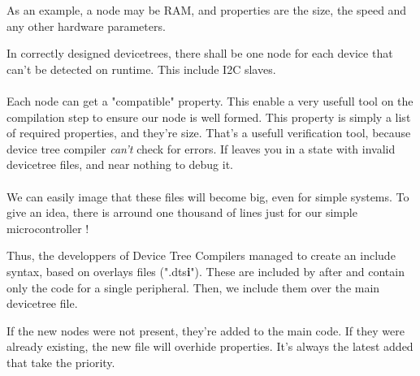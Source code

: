 As an example, a node may be RAM, and properties are the size, the speed and
any other hardware parameters.

In correctly designed devicetrees, there shall be one node for each device that
can't be detected on runtime. This include I2C slaves.

\paragraph{}
Each node can get a "compatible" property. This enable a very usefull tool on
the compilation step to ensure our node is well formed. This property is simply
a list of required properties, and they're size. That's a usefull verification
tool, because device tree compiler \textit{can't} check for errors. If leaves
you in a state with invalid devicetree files, and near nothing to debug it.

\paragraph{}
We can easily image that these files will become big, even for simple systems.
To give an idea, there is arround one thousand of lines just for our simple
microcontroller !

Thus, the developpers of Device Tree Compilers managed to create an include
syntax, based on overlays files (".dts\textbf{i}"). These are included by after
and contain only the code for a single peripheral. Then, we include them over
the main devicetree file.

If the new nodes were not present, they're added to the main code. If they were
already existing, the new file will overhide properties. It's always the latest
added that take the priority.

